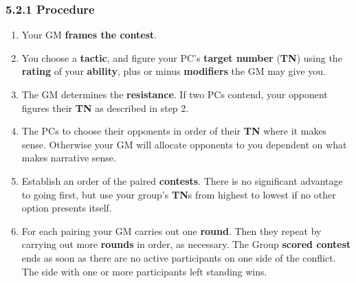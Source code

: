 \documentclass[
]{article}
\providecommand{\tightlist}{%
  \setlength{\itemsep}{0pt}\setlength{\parskip}{0pt}}
\begin{document}
\hypertarget{procedure-4}{%
\subsubsection{5.2.1 Procedure}\label{procedure-4}}

\begin{enumerate}
\def\labelenumi{\arabic{enumi}.}
\tightlist
\item
  Your GM \textbf{frames the contest}.
\item
  You choose a \textbf{tactic}, and figure your PC's \textbf{target
  number} (\textbf{TN}) using the \textbf{rating} of your
  \textbf{ability}, plus or minus \textbf{modifiers} the GM may give
  you.
\item
  The GM determines the \textbf{resistance}. If two PCs contend, your
  opponent figures their \textbf{TN} as described in step 2.
\item
  The PCs to choose their opponents in order of their \textbf{TN} where
  it makes sense. Otherwise your GM will allocate opponents to you
  dependent on what makes narrative sense.
\item
  Establish an order of the paired \textbf{contests}. There is no
  significant advantage to going first, but use your group's
  \textbf{TN}s from highest to lowest if no other option presents
  itself.
\item
  For each pairing your GM carries out one \textbf{round}. Then they
  repeat by carrying out more \textbf{rounds} in order, as necessary.
  The Group \textbf{scored contest} ends as soon as there are no active
  participants on one side of the conflict. The side with one or more
  participants left standing wins.


\end{enumerate}
\end{document}
